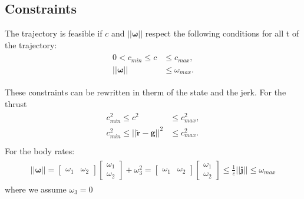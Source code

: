 \subsection{Constraints}
The trajectory is feasible if $c$ and $||\boldsymbol{\omega}||$ respect the following conditions for all t of the trajectory:
\begin{align}
\begin{split}
0 < c_{min} \leq c &\leq c_{max},\\
||\boldsymbol{\omega}|| & \leq \omega_{max}.
\end{split}
\end{align}

These constraints can be rewritten in therm of the state and the jerk. For the thrust
\begin{align}
\begin{split}
 c_{min}^2 \leq c^2 &\leq c_{max}^2,\\
 c_{min}^2 \leq ||\ddot{\boldsymbol{r}} - \boldsymbol{g}||^2 &\leq c_{max}^2.\\
\end{split}
\label{eq:feasib_thrust}
\end{align}
For the body rates:
\begin{align}
\begin{split}
||\boldsymbol{\omega}|| =
 {\begin{bmatrix}
\omega_1 & \omega_2
\end{bmatrix}}
 {\begin{bmatrix}
\omega_1 \\[10pt]
\omega_2
\end{bmatrix}} + \omega_3^2 = {\begin{bmatrix}
\omega_1 & \omega_2
\end{bmatrix}}
 {\begin{bmatrix}
\omega_1 \\[10pt]
\omega_2
\end{bmatrix}}  \leq \frac{1}{c}||\boldsymbol{j}||  \leq \omega_{max} 
\end{split}
\label{eq:feasib_bodyrates}
\end{align}
where we assume $\omega_3 = 0$

